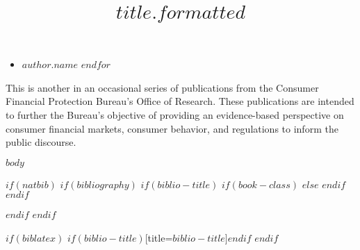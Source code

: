 \documentclass[article$if(classoption)$,$classoption$$endif$]{dp}
\title{$title.formatted$}
\begin{document}
\maketitle
\restoregeometry

\fancyfoot[R]{}
\begin{itemize}[label=\FilledSmallSquare]
  $for(author)$
    \item $author.name$
  $endfor$
\end{itemize}

This is another in an occasional series of publications from the Consumer Financial Protection Bureau's Office of Research. These publications are intended to further the Bureau's objective of providing an evidence-based perspective on consumer financial markets, consumer behavior, and regulations to inform the public discourse.
\newpage

\tableofcontents
\newpage


$body$

$if(natbib)$
$if(bibliography)$
$if(biblio-title)$
$if(book-class)$
\renewcommand\bibname{$biblio-title$}
$else$
\renewcommand\refname{$biblio-title$}
$endif$
$endif$

$endif$
$endif$

$if(biblatex)$
\printbibliography$if(biblio-title)$[title=$biblio-title$]$endif$
$endif$
\end{document}
